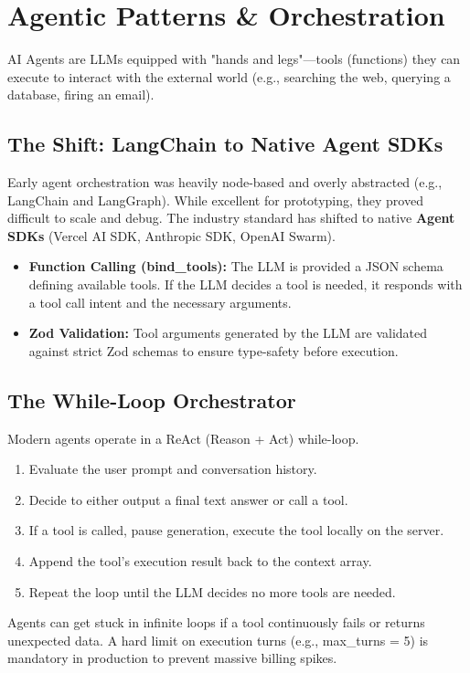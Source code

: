 \documentclass[12pt,a4paper,oneside]{book}
\begin{document}
\chapter{Agentic Patterns \& Orchestration}
AI Agents are LLMs equipped with "hands and legs"---tools (functions) they can execute to interact with the external world (e.g., searching the web, querying a database, firing an email).

\section{The Shift: LangChain to Native Agent SDKs}
Early agent orchestration was heavily node-based and overly abstracted (e.g., LangChain and LangGraph). While excellent for prototyping, they proved difficult to scale and debug. The industry standard has shifted to native \textbf{Agent SDKs} (Vercel AI SDK, Anthropic SDK, OpenAI Swarm).
\begin{itemize}
    \item \textbf{Function Calling (bind\_tools):} The LLM is provided a JSON schema defining available tools. If the LLM decides a tool is needed, it responds with a tool call intent and the necessary arguments.
    \item \textbf{Zod Validation:} Tool arguments generated by the LLM are validated against strict Zod schemas to ensure type-safety before execution.
\end{itemize}

\section{The While-Loop Orchestrator}
Modern agents operate in a ReAct (Reason + Act) while-loop. 
\begin{enumerate}
    \item Evaluate the user prompt and conversation history.
    \item Decide to either output a final text answer or call a tool.
    \item If a tool is called, pause generation, execute the tool locally on the server.
    \item Append the tool's execution result back to the context array.
    \item Repeat the loop until the LLM decides no more tools are needed.
\end{enumerate}

\begin{warningbox}
Agents can get stuck in infinite loops if a tool continuously fails or returns unexpected data. A hard limit on execution turns (e.g., max\_turns = 5) is mandatory in production to prevent massive billing spikes.
\end{warningbox}
\end{document}
